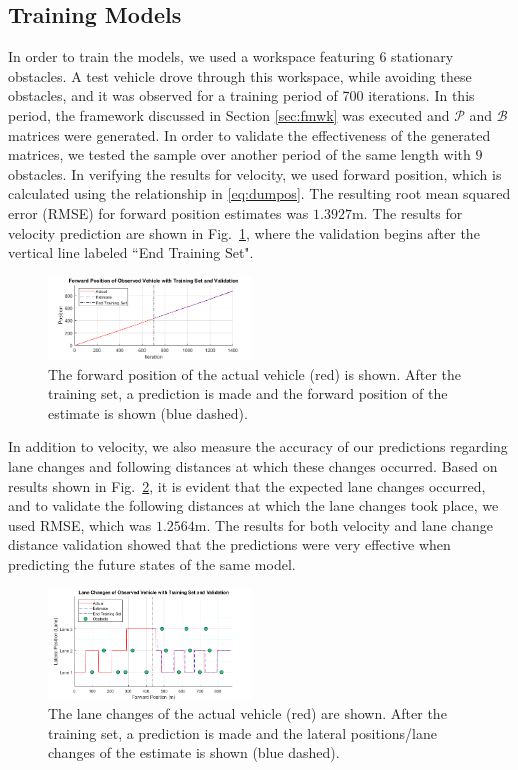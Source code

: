 \documentclass[letterpaper, 10 pt, conference]{ieeeconf}  %
\begin{document}
\subsection{Training Models}
In order to train the models, we used a workspace featuring $6$ stationary obstacles. A test vehicle drove through this workspace, while avoiding these obstacles, and it was observed for a training period of 700 iterations. In this period, the framework discussed in Section \ref{sec:fmwk} was executed and $\mathcal P$ and $\mathcal B$ matrices were generated. In order to validate the effectiveness of the generated matrices, we tested the sample over another period of the same length with $9$ obstacles. In verifying the results for velocity, we used forward position, which is calculated using the relationship in \eqref{eq:dumpos}. The resulting root mean squared error (RMSE) for forward position estimates was $1.3927$m. The results for velocity prediction are shown in Fig.~\ref{fig:train1}, where the validation begins after the vertical line labeled ``End Training Set". 

\begin{figure}[ht]
\includegraphics[width=0.48\textwidth]{fig/train1.png}
\caption{The forward position of the actual vehicle (red) is shown. After the training set, a prediction is made and the forward position of the estimate is shown (blue dashed).} \label{fig:train1}
\end{figure}

In addition to velocity, we also measure the accuracy of our predictions regarding lane changes and following distances at which these changes occurred. Based on results shown in Fig.~\ref{fig:train2}, it is evident that the expected lane changes occurred, and to validate the following distances at which the lane changes took place, we used RMSE, which was $1.2564$m. The results for both velocity and lane change distance validation showed that the predictions were very effective when predicting the future states of the same model.

\begin{figure}[ht]
\includegraphics[width=0.48\textwidth]{fig/train2.png}
\caption{The lane changes of the actual vehicle (red) are shown. After the training set, a prediction is made and the lateral positions/lane changes of the estimate is shown (blue dashed).} \label{fig:train2}
\end{figure}
\end{document}
